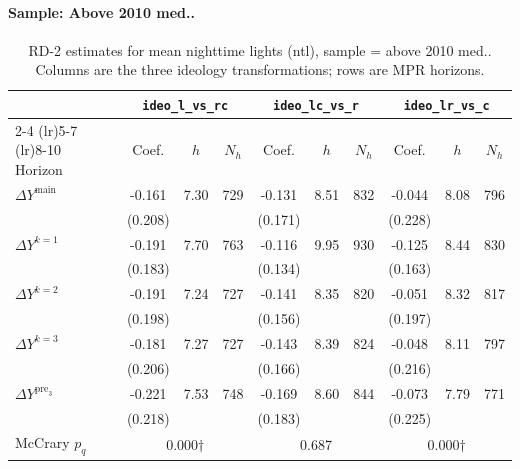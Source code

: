 \documentclass[11pt]{article}
\begin{document}
\paragraph{Sample: Above 2010 med..}
\begin{table}[H]
\centering
\scriptsize
\caption{RD-2 estimates for mean nighttime lights (ntl), sample = above 2010 med..
Columns are the three ideology transformations; rows are MPR horizons.}
\label{tab:rd2_mean_night_above}
\begin{tabular}{l ccc ccc ccc}
\toprule
 & \multicolumn{3}{c}{\texttt{ideo\_l\_vs\_rc}}
 & \multicolumn{3}{c}{\texttt{ideo\_lc\_vs\_r}}
 & \multicolumn{3}{c}{\texttt{ideo\_lr\_vs\_c}} \\
\cmidrule(lr){2-4} \cmidrule(lr){5-7} \cmidrule(lr){8-10}
Horizon & Coef. & $h$ & $N_h$ & Coef. & $h$ & $N_h$ & Coef. & $h$ & $N_h$ \\
\midrule
$\Delta Y^{\text{main}}$ & -0.161 & 7.30 & 729 & -0.131 & 8.51 & 832 & -0.044 & 8.08 & 796 \\
 & (0.208) &  &  & (0.171) &  &  & (0.228) &  &  \\
\addlinespace[1pt]
$\Delta Y^{k=1}$ & -0.191 & 7.70 & 763 & -0.116 & 9.95 & 930 & -0.125 & 8.44 & 830 \\
 & (0.183) &  &  & (0.134) &  &  & (0.163) &  &  \\
\addlinespace[1pt]
$\Delta Y^{k=2}$ & -0.191 & 7.24 & 727 & -0.141 & 8.35 & 820 & -0.051 & 8.32 & 817 \\
 & (0.198) &  &  & (0.156) &  &  & (0.197) &  &  \\
\addlinespace[1pt]
$\Delta Y^{k=3}$ & -0.181 & 7.27 & 727 & -0.143 & 8.39 & 824 & -0.048 & 8.11 & 797 \\
 & (0.206) &  &  & (0.166) &  &  & (0.216) &  &  \\
\addlinespace[1pt]
$\Delta Y^{\text{pre}_3}$ & -0.221 & 7.53 & 748 & -0.169 & 8.60 & 844 & -0.073 & 7.79 & 771 \\
 & (0.218) &  &  & (0.183) &  &  & (0.225) &  &  \\
\addlinespace[1pt]
\midrule
McCrary $p_q$ & \multicolumn{3}{c}{0.000$\dagger$} & \multicolumn{3}{c}{0.687} & \multicolumn{3}{c}{0.000$\dagger$} \\
\bottomrule
\end{tabular}
\end{table}
\end{document}
